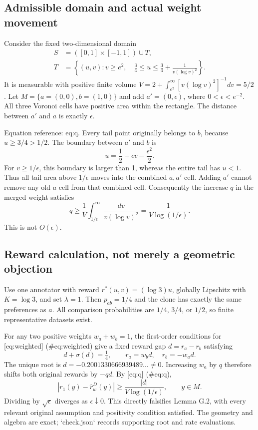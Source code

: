 \documentclass[10pt]{article}
\begin{document}
\subsection*{Admissible domain and actual weight movement}
Consider the fixed two-dimensional domain \[\begin{aligned}
 S&=([0,1]\times[-1,1])\cup T,\\
 T&=\left\{(u,v):v\ge e^2,\quad
       \frac34\le u\le\frac34+\frac1{v(\log v)^2}\right\}.\end{aligned}\] It is measurable with positive finite volume \(V=2+\int_{e^2}^{\infty}[v(\log v)^2]^{-1}dv=5/2\). Let \(M=\{a=(0,0),b=(1,0)\}\) and add \(a'=(0,\epsilon)\), where \(0<\epsilon<e^{-2}\). All three Voronoi cells have positive area within the rectangle. The distance between \(a'\) and \(a\) is exactly \(\epsilon\).\par
Equation reference: eq:q. Every tail point originally belongs to \(b\), because \(u\ge3/4>1/2\). The boundary between \(a'\) and \(b\) is \[u=\frac12+\epsilon v-\frac{\epsilon^2}{2}.\] For \(v\ge1/\epsilon\), this boundary is larger than 1, whereas the entire tail has \(u<1\). Thus all tail area above \(1/\epsilon\) moves into the combined \(a,a'\) cell. Adding \(a'\) cannot remove any old \(a\) cell from that combined cell. Consequently the increase \(q\) in the merged weight satisfies \[
 q\ge \frac1V\int_{1/\epsilon}^{\infty}\frac{dv}{v(\log v)^2}
   =\frac1{V\log(1/\epsilon)}.\] This is not \(O(\epsilon)\).\par
\subsection*{Reward calculation, not merely a geometric objection}
Use one annotator with reward \(r^*(u,v)=(\log3)u\), globally Lipschitz with \(K=\log3\), and set \(\lambda=1\). Then \(p_{ab}=1/4\) and the clone has exactly the same preferences as \(a\). All comparison probabilities are \(1/4\), \(3/4\), or \(1/2\), so finite representative datasets exist.\par
For any two positive weights \(w_a+w_b=1\), the first-order conditions for [eq:weighted] (\#eq:weighted) give a fixed reward gap \(d=r_a-r_b\) satisfying \[d+\sigma(d)=\tfrac14,\qquad
 r_a=w_b d,\quad r_b=-w_a d.\] The unique root is \(d=-0.2001330666939489\ldots\ne0\). Increasing \(w_a\) by \(q\) therefore shifts both original rewards by \(-qd\). By [eq:q] (\#eq:q), \[|r_1(y)-\widehat r_w^D(y)|
 \ge\frac{|d|}{V\log(1/\epsilon)},\qquad y\in M.\] Dividing by \(\sqrt\epsilon\) diverges as \(\epsilon\downarrow0\). This directly falsifies Lemma G.2, with every relevant original assumption and positivity condition satisfied. The geometry and algebra are exact; `check.json` records supporting root and rate evaluations.\par
\end{document}
